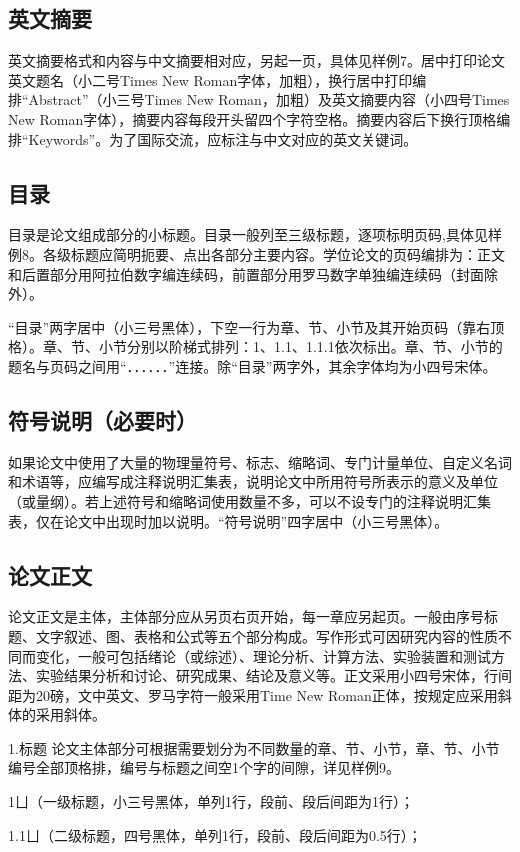 \subsection{英文摘要}
英文摘要格式和内容与中文摘要相对应，另起一页，具体见样例7。居中打印论文英文题名（小二号Times New Roman字体，加粗），换行居中打印编排“Abstract”（小三号Times New Roman，加粗）及英文摘要内容（小四号Times New Roman字体），摘要内容每段开头留四个字符空格。摘要内容后下换行顶格编排“Keywords”。为了国际交流，应标注与中文对应的英文关键词。
\subsection{目录}
目录是论文组成部分的小标题。目录一般列至三级标题，逐项标明页码,具体见样例8。各级标题应简明扼要、点出各部分主要内容。学位论文的页码编排为：正文和后置部分用阿拉伯数字编连续码，前置部分用罗马数字单独编连续码（封面除外）。

“目录”两字居中（小三号黑体），下空一行为章、节、小节及其开始页码（靠右顶格）。章、节、小节分别以阶梯式排列：1、1.1、1.1.1依次标出。章、节、小节的题名与页码之间用“．．．．．．”连接。除“目录”两字外，其余字体均为小四号宋体。

\subsection{符号说明（必要时）}
如果论文中使用了大量的物理量符号、标志、缩略词、专门计量单位、自定义名词和术语等，应编写成注释说明汇集表，说明论文中所用符号所表示的意义及单位（或量纲）。若上述符号和缩略词使用数量不多，可以不设专门的注释说明汇集表，仅在论文中出现时加以说明。“符号说明”四字居中（小三号黑体）。

\subsection{论文正文}
论文正文是主体，主体部分应从另页右页开始，每一章应另起页。一般由序号标题、文字叙述、图、表格和公式等五个部分构成。写作形式可因研究内容的性质不同而变化，一般可包括绪论（或综述）、理论分析、计算方法、实验装置和测试方法、实验结果分析和讨论、研究成果、结论及意义等。正文采用小四号宋体，行间距为20磅，文中英文、罗马字符一般采用Time New Roman正体，按规定应采用斜体的采用斜体。

1.标题
论文主体部分可根据需要划分为不同数量的章、节、小节，章、节、小节编号全部顶格排，编号与标题之间空1个字的间隙，详见样例9。

1ㄩ（一级标题，小三号黑体，单列1行，段前、段后间距为1行）；

1.1ㄩ（二级标题，四号黑体，单列1行，段前、段后间距为0.5行）；

